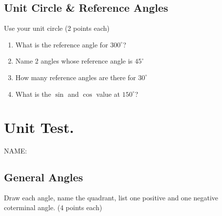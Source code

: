 \documentclass[12pt]{article}
\begin{document}
\subsection*{Unit Circle \& Reference Angles}

Use your unit circle (2 points each)\\

\begin{enumerate}[resume]

\item What is the reference angle for $300^\circ$?\\

\item Name 2 angles whose reference angle is $45^\circ$\\

\item How many reference angles are there for $30^\circ$\\

\item What is the $\sin$ and $\cos$ value at $150^\circ$?\\

\end{enumerate}

\section*{Unit Test.}

\hfill NAME:\underline{\hspace*{3in}}

\subsection*{General Angles}

Draw each angle, name the quadrant, list one positive and one negative coterminal angle. (4 points each)\\
\end{document}
